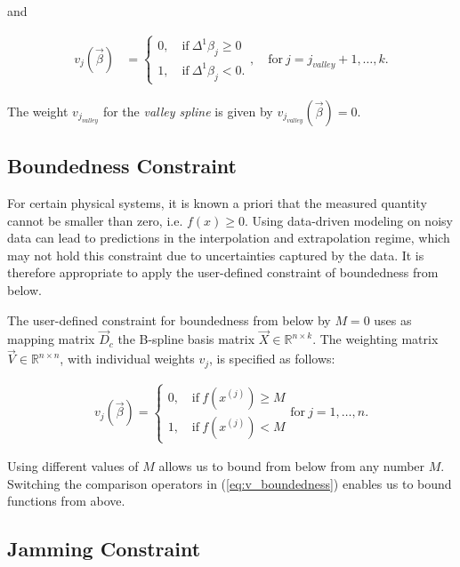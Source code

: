\documentclass[10pt,a4paper]{report}
\begin{document}
and 

\begin{align}\label{eq:v_valley_2}
	v_j(\vec{\beta}) &= \begin{cases} 
		0, \quad \text{if} \ \Delta^1\beta_j \ge 0 \\ 
		1, \quad \text{if} \ \Delta^1\beta_j < 0.
	\end{cases}, \quad \text{for} \  j=j_{valley}+1, \dots, k.
\end{align}

The weight $v_{j_{valley}}$ for the \emph{valley spline} is given by $v_{j_{valley}}(\vec{\beta}) = 0$.

\subsection{Boundedness Constraint}

For certain physical systems, it is known a priori that the measured quantity cannot be smaller than zero, i.e. $f(x) \ge 0$. Using data-driven modeling on noisy data can lead to predictions in the interpolation and extrapolation regime, which may not hold this constraint due to uncertainties captured by the data. It is therefore appropriate to apply the user-defined constraint of boundedness from below.

The user-defined constraint for boundedness from below by $M=0$ uses as mapping matrix $\vec{D}_c$ the B-spline basis matrix $\vec{X} \in \mathbb{R}^{n \times k}$. The weighting matrix $\vec{V} \in \mathbb{R}^{n\times n}$, with individual weights $v_j$, is specified as follows:

\begin{align} \label{eq:v_boundedness}
	v_j(\vec{\beta}) = \begin{cases} 
		0, \quad \text{if} \ f(x^{(j)}) \ge M\\ 
		1, \quad \text{if} \ f(x^{(j)})  < M 		
	\end{cases} \text{for} \ j=1, \dots, n.
\end{align}

Using different values of $M$ allows us to bound from below from any number $M$. Switching the comparison operators in (\ref{eq:v_boundedness}) enables us to bound functions from above. 

\subsection{Jamming Constraint}
\end{document}
